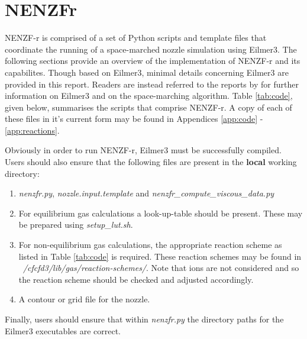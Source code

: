 
\newpage
\section{NENZFr}
\label{chapter-nenzfr}

NENZF-r is comprised of a set of Python scripts and template files that coordinate the running of a space-marched nozzle simulation using Eilmer3. The following sections provide an overview of the implementation of NENZF-r and its capabilites. Though based on Eilmer3, minimal details concerning Eilmer3 are provided in this report. Readers are instead referred to the reports by \cite{} for further information on Eilmer3 and on the space-marching algorithm. Table \ref{tab:code}, given below, summarises the scripts that comprise NENZF-r. A copy of each of these files in it's current form may be found in Appendices \ref{app:code} - \ref{app:reactions}. 

Obviously in order to run NENZF-r, Eilmer3 must be successfully compiled. Users should also ensure that the following files are present in the \textbf{local} working directory:
\begin{enumerate}
\item \textit{nenzfr.py}, \textit{nozzle.input.template} and \textit{nenzfr\_compute\_viscous\_data.py}
\item For equilibrium gas calculations a look-up-table should be present. These may be prepared using \textit{setup\_lut.sh}.
\item For non-equilibrium gas calculations, the appropriate reaction scheme as listed in Table \ref{tab:code} is required. These reaction schemes may be found in \textit{~/cfcfd3/lib/gas/reaction-schemes/}. Note that ions are not considered and so the reaction scheme should be checked and adjusted accordingly.
\item A contour or grid file for the nozzle.
\end{enumerate}
Finally, users should ensure that within \textit{nenzfr.py} the directory paths for the Eilmer3 executables are correct. 

